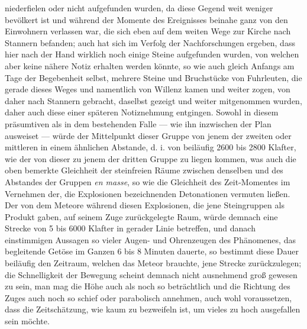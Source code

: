\documentclass[a4paper, 11pt, oneside, german]{article}
\begin{document}
niederfielen oder nicht aufgefunden wurden, da diese Gegend weit weniger bevölkert ist und während der Momente des Ereignisses beinahe ganz von den Einwohnern verlassen war, die sich eben auf dem weiten Wege zur Kirche nach Stannern befanden; auch hat sich im Verfolg der Nachforschungen ergeben, dass hier nach der Hand wirklich noch einige Steine aufgefunden wurden, von welchen aber keine nähere Notiz erhalten werden könnte, so wie auch gleich Anfangs am Tage der Begebenheit selbst, mehrere Steine und Bruchstücke von Fuhrleuten, die gerade dieses Weges und namentlich von Willenz kamen und weiter zogen, von daher nach Stannern gebracht, daselbst gezeigt und weiter mitgenommen wurden, daher auch diese einer späteren Notiznehmung entgingen. Sowohl in diesem präsumtiven als in dem bestehenden Falle --- wie ihn inzwischen der Plan ausweiset --- würde der Mittelpunkt dieser Gruppe von jenem der zweiten oder mittleren in einem ähnlichen Abstande, d. i. von beiläufig 2600 bis 2800 Klafter, wie der von dieser zu jenem der dritten Gruppe zu liegen kommen, was auch die oben bemerkte Gleichheit der steinfreien Räume zwischen denselben und des Abstandes der Gruppen \emph{en masse}, so wie die Gleichheit des Zeit-Momentes im Vernehmen der, die Explosionen bezeichnenden Detonationen vermuten ließen. Der von dem Meteore während diesen Explosionen, die jene Steingruppen als Produkt gaben, auf seinem Zuge zurückgelegte Raum, würde demnach eine Strecke von 5 bis 6000 Klafter in gerader Linie betreffen, und danach einstimmigen Aussagen so vieler Augen- und Ohrenzeugen des Phänomenes, das begleitende Getöse im Ganzen 6 bis 8 Minuten dauerte, so bestimmt diese Dauer beiläufig den Zeitraum, welchen das Meteor brauchte, jene Strecke zurückzulegen; die Schnelligkeit der Bewegung scheint demnach nicht ausnehmend groß gewesen zu sein, man mag die Höhe auch als noch so beträchtlich und die Richtung des Zuges auch noch so schief oder parabolisch annehmen, auch wohl voraussetzen, dass die Zeitschätzung, wie kaum zu bezweifeln ist, um vieles zu hoch ausgefallen sein möchte.
\end{document}
